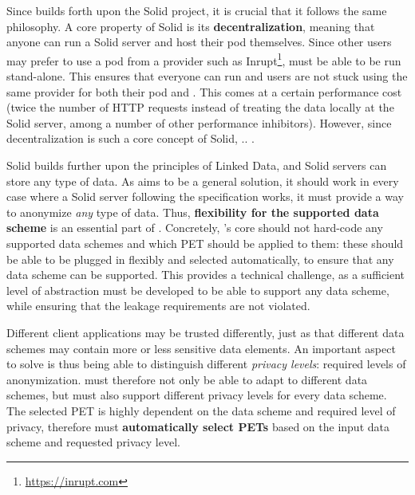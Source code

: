 Since \middleware{} builds forth upon the Solid project, it is crucial that it follows the same philosophy. A core property of Solid is its \textbf{decentralization}, meaning that anyone can run a Solid server and host their pod themselves. Since other users may prefer to use a pod from a provider such as Inrupt\footnote{\url{https://inrupt.com}}, \middleware{} must be able to be run stand-alone. This ensures that 
everyone can run \middleware{} and users are not stuck using the same provider for both their pod and \middleware{}. This comes at a certain performance cost (twice the number of HTTP requests instead of treating the data locally at the Solid server, among a number of other performance inhibitors). However, since decentralization is such a core concept of Solid, .. .

Solid builds further upon the principles of Linked Data, and Solid servers can store any type of data. As \middleware{} aims to be a general solution, it should work in every case where a Solid server following the specification works, it must provide a way to anonymize \textit{any} type of data. Thus, \textbf{flexibility for the supported data scheme} is an essential part of \middleware{}. Concretely, \middleware{}'s core should not hard-code any supported data schemes and which PET should be applied to them: these should be able to be plugged in flexibly and selected automatically, to ensure that any data scheme can be supported. This provides a technical challenge, as a sufficient level of abstraction must be developed to be able to support any data scheme, while ensuring that the leakage requirements are not violated.

Different client applications may be trusted differently, just as that different data schemes may contain more or less sensitive data elements. An important aspect to solve is thus being able to distinguish different \textit{privacy levels}: required levels of anonymization. \middleware{} must therefore not only be able to adapt to different data schemes, but must also support different privacy levels for every data scheme. The selected PET is highly dependent on the data scheme and required level of privacy, therefore \middleware{} must \textbf{automatically select \gls{PETs}} based on the input data scheme and requested privacy level.

